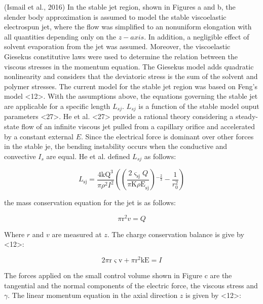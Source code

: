 (Ismail et al., 2016)
In the stable jet region, shown in Figures a and b, the slender body approximation is assumed to model the stable viscoelastic electrospun jet, where the flow was simplified to an nonuniform elongation with all quantities depending only on the $z-axis$. In addition, a negligible effect of solvent evaporation from the jet was assumed. Moreover, the viscoelastic Giesekus constitutive laws were used to determine the relation between the viscous stresses in the momentum equation. The Giesekus model adds quadratic nonlinearity and considers that the deviatoric stress is the sum of the solvent and polymer stresses. The current model for the stable jet region was based on Feng's model <12>. With the assumptions above, the equations governing the stable jet are applicable for a specific length $L_{sj}$. $L_{sj}$ is a function of the stable model ouput parameters <27>. He et al. <27> provide a rational theory considering a steady-state flow of an infinite viscous jet pulled from a capillary orifice and accelerated by a constant external $E$. Since the electrical force is dominant over other forces in the stable je, the bending instability occurs when the conductive and convective $I_{s}$ are equal. He et al. defined $L_{sj}$ as follows:

\begin{equation}
L_{\text{sj}}=\frac{4 \text{kQ}^3}{\pi \rho ^2 I^2}\left(\left(\frac{2 \varsigma_{\text{sj}}
   Q}{\text{$\pi $K$\rho $E}_{\text{sj}}}\right){}^{-\frac{2}{3}}-\frac{1}{r_0^2}\right)
\label{eq:specificLength}
\end{equation}

the mass conservation equation for the jet is as follows:

\begin{equation}
\text{$\pi $r}^2 v=Q
\label{eq:massConservation}
\end{equation}

Where $r$ and $v$ are measured at $z$. The charge conservation balance is give by <12>:

\begin{equation}
2 \text{$\pi $r$\varsigma$v}+\text{$\pi $r}^2 \text{kE}=I
\label{eq:chargeConservation}
\end{equation}

The forces applied on the small control volume shown in Figure c are the tangential and the normal components of the electric force, the viscous stress and $\gamma$. The linear momentum equation in the axial direction $z$ is given by <12>:

